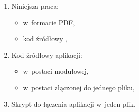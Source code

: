 \begin{enumerate}
\item Niniejsza praca:
	\begin{itemize}
	\item w~formacie PDF,
	\item kod źródłowy \XeTeX,
	\end{itemize}
\item Kod źródłowy aplikacji:
	\begin{itemize}
	\item w~postaci modułowej,
	\item w~postaci złączonej do jednego pliku,
	\end{itemize}
\item Skrypt do łączenia aplikacji w~jeden plik.
\end{enumerate}
